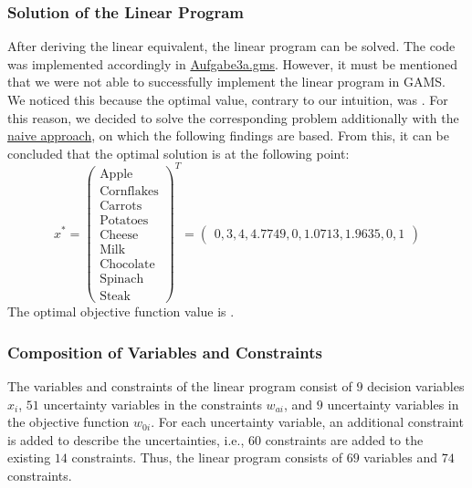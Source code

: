 \documentclass[a4paper,12pt]{article}
\begin{document}
\newpage

\subsubsection*{Solution of the Linear Program}

After deriving the linear equivalent, the linear program can be solved. The code was implemented accordingly in \href{../src/r3/Aufgabe3a.gms}{Aufgabe3a.gms}.
However, it must be mentioned that we were not able to successfully implement the linear program in GAMS. We noticed this because the optimal value, contrary to our intuition, was . For this reason, we decided to solve the corresponding problem additionally with the \href{../src/r3/Aufgabe3a_NaiveApproach.gms}{naive approach}, on which the following findings are based.
From this, it can be concluded that the optimal solution is at the following point:
\[
x^* = \begin{pmatrix}
    \text{Apple} \\ \text{Cornflakes} \\ \text{Carrots} \\ \text{Potatoes} \\ \text{Cheese} \\ \text{Milk} \\ \text{Chocolate} \\ \text{Spinach} \\ \text{Steak}
    \end{pmatrix}^T
     =
     \begin{pmatrix}
     0, 3, 4, 4.7749, 0, 1.0713, 1.9635, 0, 1
        \end{pmatrix}
\]
The optimal objective function value is .

\subsubsection*{Composition of Variables and Constraints} 

The variables and constraints of the linear program consist of $9$ decision variables $x_i$, $51$ uncertainty variables in the constraints $w_{ai}$, and $9$ uncertainty variables in the objective function $w_{0i}$.
For each uncertainty variable, an additional constraint is added to describe the uncertainties, i.e., $60$ constraints are added to the existing $14$ constraints.
Thus, the linear program consists of $69$ variables and $74$ constraints.

\newpage
\end{document}
